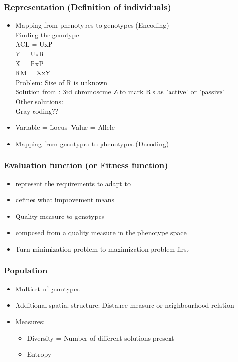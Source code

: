 \subsubsection{Representation (Definition of individuals)}
    \begin{itemize}
        \item Mapping from phenotypes to genotypes (Encoding)\\
        Finding the genotype \cite{Igor}\\
        ACL = UxP\\
        Y = UxR\\
        X = RxP\\
        RM = XxY\\
        Problem: Size of R is unknown\\
        Solution from \cite{Igor}: 3rd chromosome Z to mark R's as "active" or "passive"\\
        Other solutions: \\
        Gray coding??
        \item Variable = Locus; Value = Allele
        \item Mapping from genotypes to phenotypes (Decoding)
    \end{itemize}
\subsubsection{Evaluation function (or Fitness function)}
    \begin{itemize}
        \item represent the requirements to adapt to
        \item defines what improvement means
        \item Quality measure to genotypes
        \item composed from a quality measure in the phenotype space
        \item Turn minimization problem to maximization problem first
    \end{itemize}
\subsubsection{Population}
    \begin{itemize}
        \item Multiset of genotypes
        \item Additional spatial structure: Distance measure or neighbourhood relation
        \item Measures:
        \begin{itemize}
            \item Diversity = Number of different solutions present
            \item Entropy
        \end{itemize}
    \end{itemize}
